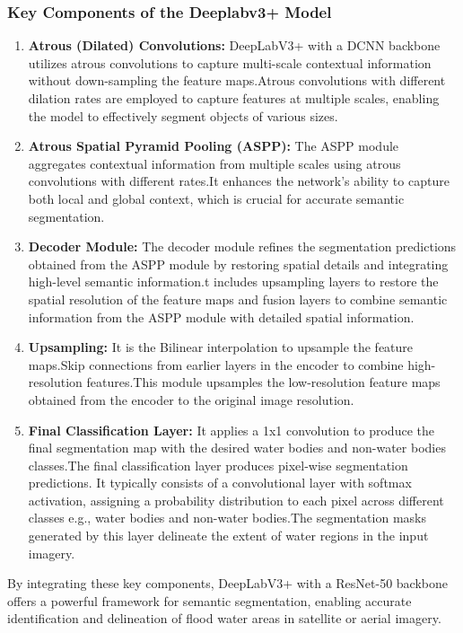 \subsubsection{Key Components of the Deeplabv3+ Model}
\begin{enumerate}
    \item \textbf{Atrous (Dilated) Convolutions: }DeepLabV3+ with a DCNN backbone utilizes atrous convolutions to capture multi-scale contextual information without down-sampling the feature maps.Atrous convolutions with different dilation rates are employed to capture features at multiple scales, enabling the model to effectively segment objects of various sizes.

    \item \textbf{Atrous Spatial Pyramid Pooling (ASPP): }The ASPP module aggregates contextual information from multiple scales using atrous convolutions with different rates.It enhances the network's ability to capture both local and global context, which is crucial for accurate semantic segmentation.
    \item \textbf{Decoder Module: }The decoder module refines the segmentation predictions obtained from the ASPP module by restoring spatial details and integrating high-level semantic information.t includes upsampling layers to restore the spatial resolution of the feature maps and fusion layers to combine semantic information from the ASPP module with detailed spatial information.
    \item \textbf{Upsampling: }It is the Bilinear interpolation to upsample the feature maps.Skip connections from earlier layers in the encoder to combine high-resolution features.This module upsamples the low-resolution feature maps obtained from the encoder to the original image resolution.
    \item \textbf{Final Classification Layer: }It applies a 1x1 convolution to produce the final segmentation map with the desired water bodies and non-water bodies classes.The final classification layer produces pixel-wise segmentation predictions. It typically consists of a convolutional layer with softmax activation, assigning a probability distribution to each pixel across different classes e.g., water bodies and non-water bodies.The segmentation masks generated by this layer delineate the extent of water regions in the input imagery.
\end{enumerate}

By integrating these key components, DeepLabV3+ with a ResNet-50 backbone offers a powerful framework for semantic segmentation, enabling accurate identification and delineation of flood water areas in satellite or aerial imagery.


